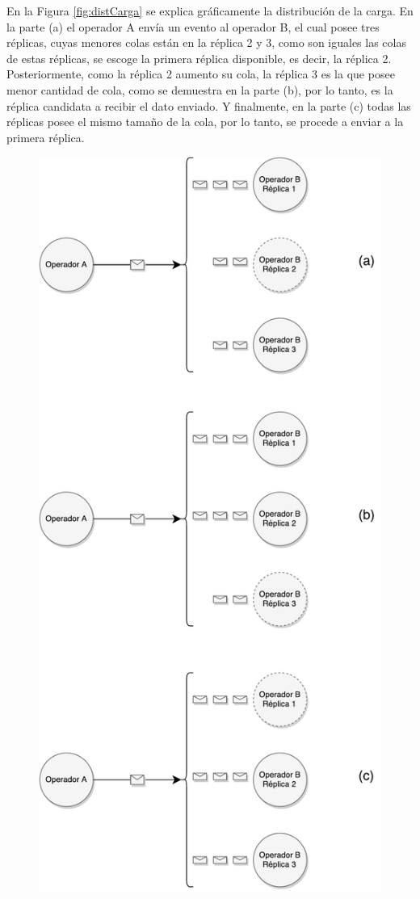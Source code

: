 En la Figura \ref{fig:distCarga} se explica gráficamente la distribución de la carga. En la parte (a) el operador A envía un evento al operador B, el cual posee tres réplicas, cuyas menores colas están en la réplica 2 y 3, como son iguales las colas de estas réplicas, se escoge la primera réplica disponible, es decir, la réplica 2. Posteriormente, como la réplica 2 aumento su cola, la réplica 3 es la que posee menor cantidad de cola, como se demuestra en la parte (b), por lo tanto, es la réplica candidata a recibir el dato enviado. Y finalmente, en la parte (c) todas las réplicas posee el mismo tamaño de la cola, por lo tanto, se procede a enviar a la primera réplica.

\begin{figure}[!ht]
	\centering
		\includegraphics[scale=0.55]{images/DistribucionCarga.pdf}

\end{figure}
